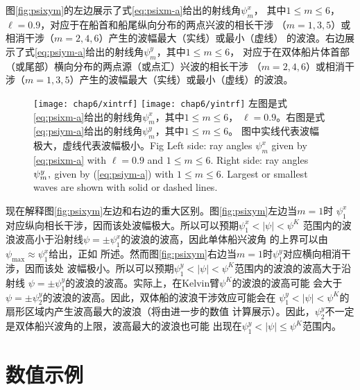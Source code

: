 图\ref{fig:psixym}的左边展示了式\eqref{eq:psixm-a}给出的射线角$\psi_m^x$，
其中$1\le m\le6$，$\ell=0.9$，对应于在船首和船尾纵向分布的两点兴波的相长干涉
（$m=1,3,5$）或相消干涉（$m=2,4,6$）产生的波幅最大（实线）或最小（虚线）
的波浪。右边展示了式\eqref{eq:psiym-a}给出的射线角$\psi_m^y$，其中$1\le m\le6$，
对应于在双体船片体首部（或尾部）横向分布的两点源（或点汇）兴波的相长干涉
（$m=2,4,6$）或相消干涉（$m=1,3,5$）产生的波幅最大（实线）或最小（虚线）的波浪。
%
\begin{figure}[htp]
  \centering
  \captionstyle{\centering}
    \texttt{[image: chap6/xintrf]}
    \texttt{[image: chap6/yintrf]}
  {左图是式\eqref{eq:psixm-a}给出的射线角$\psi_m^x$，其中$1\le m\le6$，
  $\ell=0.9$。右图是式\eqref{eq:psiym-a}给出的射线角$\psi_m^y$，其中$1\le m\le6$。
图中实线代表波幅极大，虚线代表波幅极小。}{Fig}
{Left side: ray angles $\psi^x_m$ given by \eqref{eq:psixm-a} with $\ell=0.9$ and
  $1\leq m\leq 6$. Right side: ray angles $\psi^y_m\hspace{0.05em},$ given by
 (\ref{eq:psiym-a}) with $1\leq m\leq 6$. Largest or smallest waves are 
 shown with solid or dashed lines.}
\end{figure}
%

现在解释图\ref{fig:psixym}左边和右边的重大区别。图\ref{fig:psixym}左边当$m=1$时
$\psi_1^x$对应纵向相长干涉，因而该处波幅极大。所以可以预期$\psi_1^x<|\psi|<\psi^K$
范围内的波浪波高小于沿射线$\psi=\pm\psi_1^x$的波浪的波高，因此单体船兴波角
的上界可以由$\psi_{\max}\approx\psi_1^x$给出，正如\parencite{Noblesse2014Why}
所述。然而图\ref{fig:psixym}右边当$m=1$时$\psi_1^y$对应横向相消干涉，因而该处
波幅极小。所以可以预期$\psi_1^y<|\psi|<\psi^K$范围内的波浪的波高大于沿射线
$\psi=\pm\psi_1^y$的波浪的波高。实际上，在Kelvin臂$\psi^K$的波浪的波高可能
会大于$\psi=\pm\psi_2^y$的波浪的波高。因此，双体船的波浪干涉效应可能会在
$\psi_1^y<|\psi|<\psi^K$的扇形区域内产生波高最大的波浪（将由进一步的数值
计算展示）。因此，$\psi_2^y$不一定是双体船兴波角的上限，波高最大的波浪也可能
出现在$\psi_1^y<|\psi|\le\psi^K$范围内。

\section{数值示例}
\label{sec:numillustrat}

